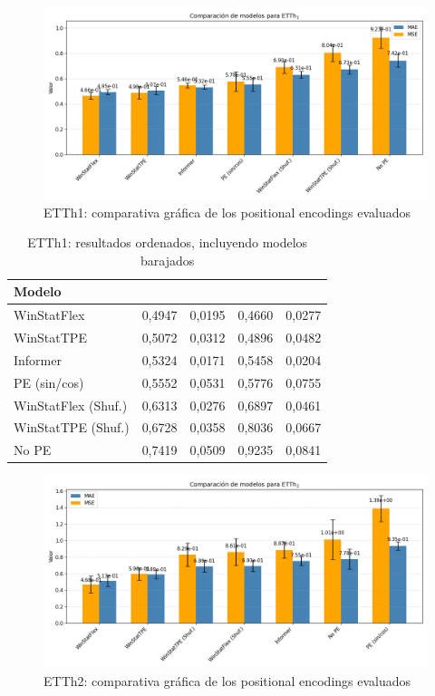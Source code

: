 \begin{figure}[!ht]
	\centering
	\includegraphics[scale=0.475]{img/etth1fin}
	\caption{ETTh1: comparativa gráfica de los positional encodings evaluados}
	\label{etth1fin}
\end{figure}

\begin{table}[ht]
	\centering
	\begin{tabular}{l|NN|NN}
		\toprule
		Modelo &  &  &  &  \\
		\midrule
		WinStatFlex            & 0,4947 & 0,0195 & 0,4660 & 0,0277 \\
		WinStatTPE             & 0,5072 & 0,0312 & 0,4896 & 0,0482 \\
		Informer               & 0,5324 & 0,0171 & 0,5458 & 0,0204 \\
		PE (sin/cos)           & 0,5552 & 0,0531 & 0,5776 & 0,0755 \\
		WinStatFlex (Shuf.)    & 0,6313 & 0,0276 & 0,6897 & 0,0461 \\
		WinStatTPE (Shuf.)     & 0,6728 & 0,0358 & 0,8036 & 0,0667 \\
		No PE                  & 0,7419 & 0,0509 & 0,9235 & 0,0841 \\
		\bottomrule
	\end{tabular}
	\caption{ETTh1: resultados ordenados, incluyendo modelos barajados}
	\label{etth1fintab}
\end{table}

\begin{figure}[!ht]
	\centering
	\includegraphics[scale=0.475]{img/etth2fin}
	\caption{ETTh2: comparativa gráfica de los positional encodings evaluados}
	\label{etth2fin}
\end{figure}




